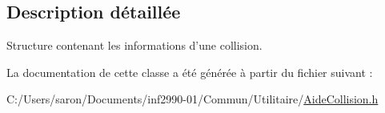 \subsection{Description détaillée}
Structure contenant les informations d'une collision. 

La documentation de cette classe a été générée à partir du fichier suivant \-:\begin{DoxyCompactItemize}
\item 
C\-:/\-Users/saron/\-Documents/inf2990-\/01/\-Commun/\-Utilitaire/\hyperlink{_aide_collision_8h}{Aide\-Collision.\-h}\end{DoxyCompactItemize}
